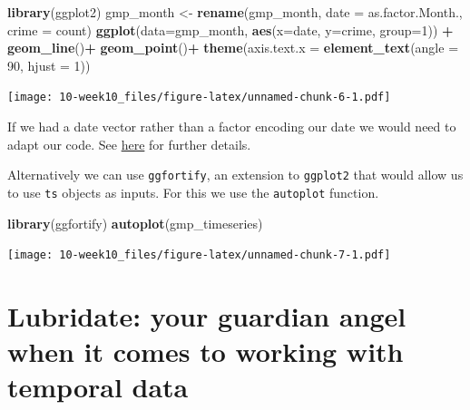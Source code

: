 \documentclass[]{book}
\newenvironment{Shaded}{\begin{snugshade}}{\end{snugshade}}
\newcommand{\DataTypeTok}[1]{\textcolor[rgb]{0.13,0.29,0.53}{#1}}
\newcommand{\DecValTok}[1]{\textcolor[rgb]{0.00,0.00,0.81}{#1}}
\newcommand{\KeywordTok}[1]{\textcolor[rgb]{0.13,0.29,0.53}{\textbf{#1}}}
\newcommand{\NormalTok}[1]{#1}
\newcommand{\OperatorTok}[1]{\textcolor[rgb]{0.81,0.36,0.00}{\textbf{#1}}}
\newcommand{\StringTok}[1]{\textcolor[rgb]{0.31,0.60,0.02}{#1}}
\begin{document}
\begin{Shaded}
\begin{Highlighting}[]
\KeywordTok{library}\NormalTok{(ggplot2)}
\NormalTok{gmp_month <-}\StringTok{ }\KeywordTok{rename}\NormalTok{(gmp_month, }\DataTypeTok{date =}\NormalTok{ as.factor.Month., }\DataTypeTok{crime =}\NormalTok{ count)}
\KeywordTok{ggplot}\NormalTok{(}\DataTypeTok{data=}\NormalTok{gmp_month, }\KeywordTok{aes}\NormalTok{(}\DataTypeTok{x=}\NormalTok{date, }\DataTypeTok{y=}\NormalTok{crime, }\DataTypeTok{group=}\DecValTok{1}\NormalTok{)) }\OperatorTok{+}
\StringTok{  }\KeywordTok{geom_line}\NormalTok{()}\OperatorTok{+}
\StringTok{  }\KeywordTok{geom_point}\NormalTok{()}\OperatorTok{+}
\StringTok{  }\KeywordTok{theme}\NormalTok{(}\DataTypeTok{axis.text.x =} \KeywordTok{element_text}\NormalTok{(}\DataTypeTok{angle =} \DecValTok{90}\NormalTok{, }\DataTypeTok{hjust =} \DecValTok{1}\NormalTok{))}
\end{Highlighting}
\end{Shaded}

\texttt{[image: 10-week10\_files/figure-latex/unnamed-chunk-6-1.pdf]}

If we had a date vector rather than a factor encoding our date we would need to adapt our code. See \href{http://www.sthda.com/english/articles/32-r-graphics-essentials/128-plot-time-series-data-using-ggplot/}{here} for further details.

Alternatively we can use \texttt{ggfortify}, an extension to \texttt{ggplot2} that would allow us to use \texttt{ts} objects as inputs. For this we use the \texttt{autoplot} function.

\begin{Shaded}
\begin{Highlighting}[]
\KeywordTok{library}\NormalTok{(ggfortify)}
\KeywordTok{autoplot}\NormalTok{(gmp_timeseries)}
\end{Highlighting}
\end{Shaded}

\texttt{[image: 10-week10\_files/figure-latex/unnamed-chunk-7-1.pdf]}

\hypertarget{lubridate-your-guardian-angel-when-it-comes-to-working-with-temporal-data}{%
\section{Lubridate: your guardian angel when it comes to working with temporal data}\label{lubridate-your-guardian-angel-when-it-comes-to-working-with-temporal-data}}
\end{document}
